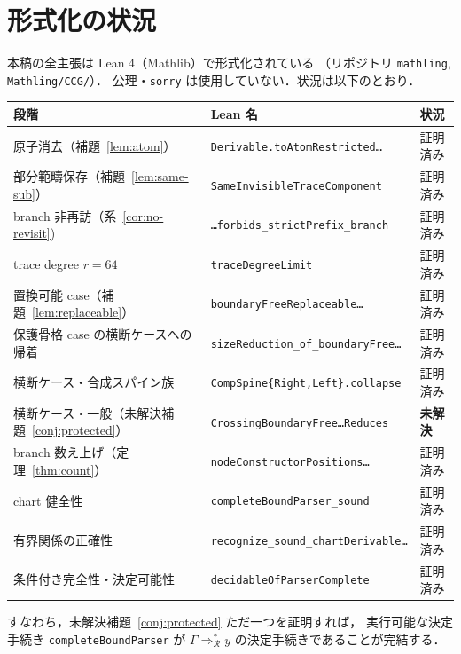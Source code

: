 \documentclass[paper=a4,fontsize=10pt,jafontscale=0.92]{jlreq}
\theoremstyle{plain}
\theoremstyle{definition}
\theoremstyle{remark}
\newcommand{\R}{\mathcal{R}}
\newcommand{\lean}[1]{\texttt{#1}}
\begin{document}
\section*{形式化の状況}

\begin{leanbox}
本稿の全主張は Lean 4（Mathlib）で形式化されている
（リポジトリ \lean{mathling}, \lean{Mathling/CCG/}）．
公理・\lean{sorry} は使用していない．状況は以下のとおり．

\medskip
\begin{center}
\renewcommand{\arraystretch}{1.3}
\begin{tabular}{lll}
\toprule
段階 & Lean 名 & 状況 \\
\midrule
原子消去（補題~\ref{lem:atom}） &
  \lean{Derivable.toAtomRestricted\ldots} & 証明済み \\
部分範疇保存（補題~\ref{lem:same-sub}） &
  \lean{SameInvisibleTraceComponent} & 証明済み \\
branch 非再訪（系~\ref{cor:no-revisit}) &
  \lean{\ldots forbids\_strictPrefix\_branch} & 証明済み \\
trace degree $r=64$ &
  \lean{traceDegreeLimit} & 証明済み \\
置換可能 case（補題~\ref{lem:replaceable}） &
  \lean{boundaryFreeReplaceable\ldots} & 証明済み \\
保護骨格 case の横断ケースへの帰着 &
  \lean{sizeReduction\_of\_boundaryFree\ldots} & 証明済み \\
横断ケース・合成スパイン族 &
  \lean{CompSpine\{Right,Left\}.collapse} & 証明済み \\
横断ケース・一般（未解決補題~\ref{conj:protected}） &
  \lean{CrossingBoundaryFree\ldots Reduces} & \textbf{未解決} \\
branch 数え上げ（定理~\ref{thm:count}） &
  \lean{nodeConstructorPositions\ldots} & 証明済み \\
chart 健全性 &
  \lean{completeBoundParser\_sound} & 証明済み \\
有界関係の正確性 &
  \lean{recognize\_sound\_chartDerivable\ldots} & 証明済み \\
条件付き完全性・決定可能性 &
  \lean{decidableOfParserComplete} & 証明済み \\
\bottomrule
\end{tabular}
\end{center}

\medskip
すなわち，未解決補題~\ref{conj:protected} ただ一つを証明すれば，
実行可能な決定手続き \lean{completeBoundParser} が
$\Gamma \Rightarrow^*_\R y$ の決定手続きであることが完結する．
\end{leanbox}
\end{document}
